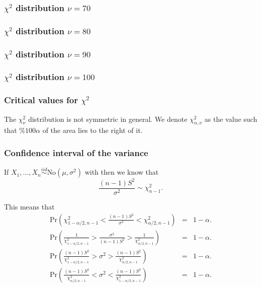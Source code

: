 \begin{frame}[fragile]\frametitle{$\chi^2$ distribution $\nu=70$}

\end{frame}
\begin{frame}[fragile]\frametitle{$\chi^2$ distribution $\nu=80$}

\end{frame}

\begin{frame}[fragile]\frametitle{$\chi^2$ distribution $\nu=90$}

\end{frame}

\begin{frame}[fragile]\frametitle{$\chi^2$ distribution $\nu=100$}

\end{frame}


\begin{frame}[fragile]\frametitle{Critical values for $\chi^2$}

The $\chi^2_{\nu}$ distribution is not symmetric in
general. We denote $\chi^2_{\alpha,\nu}$ as
the value such that $\%100\alpha$ of the area lies to the right of it.
\end{frame}

\begin{frame}[fragile]\frametitle{Confidence interval of the variance}

{\tiny
If $X_1,...,X_n \stackrel{iid}{\sim} \mbox{No}(\mu,\sigma^2)$
with then we know that 
$$\frac{(n-1) S^2}{\sigma^2} \sim \chi^2_{n-1}.$$ 

This means that
\begin{eqnarray*}
\mbox{Pr}\left(\chi^2_{1-\alpha/2,n-1} < \frac{(n-1) S^2}{\sigma^2} <
  \chi^2_{\alpha/2,n-1} \right) &= & 1 -\alpha.\\ 
\mbox{Pr}\left(\frac{1}{\chi^2_{1-\alpha/2,n-1}} > \frac{\sigma^2}{(n-1) S^2} >
  \frac{1}{\chi^2_{\alpha/2,n-1}} \right) &= & 1 -\alpha.\\ 
\mbox{Pr}\left(\frac{(n-1)S^2}{\chi^2_{1-\alpha/2,n-1}} > \sigma^2 >
  \frac{(n-1)S^2}{\chi^2_{\alpha/2,n-1}} \right) &= & 1 -\alpha.\\ 
\mbox{Pr}\left(\frac{(n-1)S^2}{\chi^2_{\alpha/2,n-1}} < \sigma^2 <
  \frac{(n-1)S^2}{\chi^2_{1-\alpha/2,n-1}} \right) &= & 1 -\alpha.
\end{eqnarray*}
}
\end{frame}


